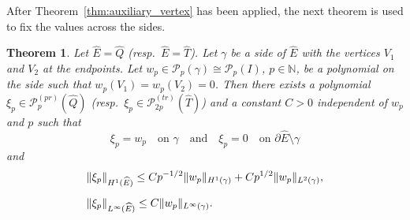 \documentclass[english, 12pt, a4paper, sci, utf8, a-2b, online]{aaltothesis}
\theoremstyle{definition}
\theoremstyle{plain}
\newtheorem{theorem}{Theorem}[section]
\DeclarePairedDelimiter\norm{\lVert}{\rVert}
\numberwithin{equation}{section}
\begin{document}
After Theorem~\ref{thm:auxiliary_vertex} has been applied,
the next theorem is used to fix the values across the sides.
\begin{theorem}
    \label{thm:auxiliary_edge}
    Let $\widehat{E} = \widehat{Q}$ (resp.\ $\widehat{E} = \widehat{T}$).
    Let $\gamma$ be a side of $\widehat{E}$ with the vertices $V_1$ and $V_2$ at the endpoints.
    Let $w_p \in \mathcal{P}_p(\gamma) \cong \mathcal{P}_p(I)$,
    $p \in \mathbb{N}$, be a polynomial on the side such that $w_p(V_1) = w_p(V_2) = 0$.
    Then there exists a polynomial $\xi_p \in \mathcal{P}_p^{(pr)}(\widehat{Q})$
    (resp.\ $\xi_p \in \mathcal{P}_{2p}^{(tr)}(\widehat{T})$) and
    a constant $C > 0$ independent of $w_p$ and $p$ such that
    \begin{equation}
        \label{eq:auxiliary_edge_boundary}
        \xi_p = w_p \text{ } \text{ on } \gamma
        \quad \text{and} \quad
        \xi_p = 0 \text{ } \text{ on } \partial \widehat{E} \setminus \gamma
    \end{equation}
    and
    \begin{align}
        \label{eq:auxiliary_edge_res1}
        &\norm{\xi_p}_{H^1(\widehat{E})}
        \leq C p^{-1/2} \norm{w_p}_{H^1(\gamma)}
            + C p^{1/2} \norm{w_p}_{L^2(\gamma)}, \\[0.5em]
        \label{eq:auxiliary_edge_res2}
        &\norm{\xi_p}_{L^{\infty}(\widehat{E})}
        \leq C \norm{w_p}_{L^{\infty}(\gamma)}.
    \end{align}
\end{theorem}
\end{document}
